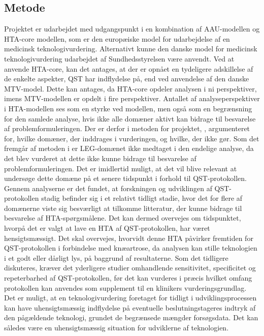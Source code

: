\subsection{Metode} \label{Metode_diskussion} %
Projektet er udarbejdet med udgangspunkt i en kombination af AAU-modellen og HTA-core modellen, som er den europæiske model for udarbejdelse af en medicinsk teknologivurdering. Alternativt kunne den danske model for medicinsk teknologivurdering udarbejdet af Sundhedsstyrelsen være anvendt. Ved at anvende HTA-core, kan det antages, at der er opnået en tydeligere adskillelse af de enkelte aspekter, QST har indflydelse på, end ved anvendelse af den danske MTV-model. Dette kan antages, da HTA-core opdeler analysen i ni perspektiver, imens MTV-modellen er opdelt i fire perspektiver. 
Antallet af analyseperspektiver i HTA-modellen ses som en styrke ved modellen, men også som en begrænsning for den samlede analyse, hvis ikke alle domæner aktivt kan bidrage til besvarelse af problemformuleringen. Der er derfor i metoden for projektet, , argumenteret for, hvilke domæner, der inddrages i vurderingen, og hvilke, der ikke gør. Som det fremgår af metoden i  er LEG-domænet ikke medtaget i den endelige analyse, da det blev vurderet at dette ikke kunne bidrage til besvarelse af problemformuleringen. Det er imidlertid muligt, at det vil blive relevant at undersøge dette domæne på et senere tidspunkt i forhold til QST-protokollen. Gennem analyserne er det fundet, at forskningen og udviklingen af QST-protokollen stadig befinder sig i et relativt tidligt stadie, hvor det for flere af domænerne viste sig besværligt at tilkomme litteratur, der kunne bidrage til besvarelse af HTA-spørgsmålene. Det kan dermed overvejes om tidspunktet, hvorpå det er valgt at lave en HTA af QST-protokollen, har været hensigtsmæssigt. Det skal overvejes, hvorvidt denne HTA påvirker fremtiden for QST-protokollen i forbindelse med knæartrose, da analysen kan stille teknologien i et godt eller dårligt lys, på baggrund af resultaterne. Som det tidligere diskuteres, kræver det yderligere studier omhandlende sensitivitet, specificitet og repeterbarhed af QST-protokollen, før det kan vurderes i præcis hvilket omfang  protokollen kan anvendes som supplement til en klinikers vurderingsgrundlag. Det er muligt, at en teknologivurdering foretaget for tidligt i udviklingsprocessen kan have uhensigtsmæssig indflydelse på eventuelle beslutningstageres indtryk af den pågældende teknologi, grundet de begrænsede mængder forsøgsdata. Det kan således være en uhensigtsmæssig situation for udviklerne af teknologien. 



